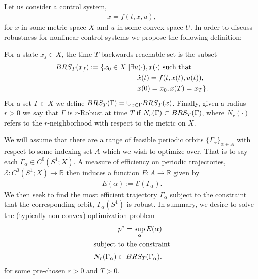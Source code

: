 
Let us consider a control system, 
\begin{align}
	\dot{x} = f(t,x,u), \label{eq:control system}
\end{align}
 for $x$ in some metric space $X$ and $u$ in some convex space $U$.
 In order to discuss robustness for nonlinear control systems we propose the following definition:
\begin{definition}
	For a state $x_{f} \in X$, the time-$T$ backwards reachable set is the subset
	\begin{align*}
		BRS_{T}( x_{f} ) := \{ x_{0} \in X \mid& \exists u(\cdot) , x(\cdot) \text{ such that } \\
			&\quad \dot{x}(t) = f(t,x(t),u(t)) ,\\
			&\quad x(0) = x_{0}, x(T) = x_{T}  \}.
	\end{align*}
	For a set $\Gamma \subset X$ we define $BRS_{T}(\Gamma) = \cup_{x \in \Gamma} BRS_{T}(x)$.
	Finally, given a radius $r > 0$ we say that $\Gamma$ is $r$-Robust at time $T$ if $N_{r}( \Gamma) \subset BRS_{T}( \Gamma )$,
	where $N_{r}( \cdot)$ refers to the $r$-neighborhood with respect to the metric on $X$.
\end{definition}

We will assume that there are a range of feasible periodic orbits $\{ \Gamma_{\alpha} \}_{\alpha \in A}$ with respect to some indexing set $A$
which we wish to optimize over.
That is to say each $\Gamma_{\alpha} \in C^{0}( S^{1} ; X)$.
A measure of efficiency on periodic trajectories, $\mathcal{E}: C^{0}( S^{1} ; X) \to \mathbb{R}$ then induces a function $E:A\to \mathbb{R}$ given by
\begin{align*}
	E( \alpha) := \mathcal{E}( \Gamma_{\alpha}).
\end{align*}
We then seek to find the most efficient trajectory $\Gamma_{\alpha}$ subject to the constraint that the corresponding orbit, $\Gamma_{\alpha}(S^{1})$ is robust.
In summary, we desire to solve the (typically non-convex) optimization problem
\begin{align*}
	p^{*} = \sup_{\alpha} E(\alpha) \\
\intertext{subject to the constraint}
	N_{r}(\Gamma_{\alpha}) \subset BRS_{T}(\Gamma_{\alpha}).
\end{align*}
for some pre-chosen $r >0$ and $T>0$.